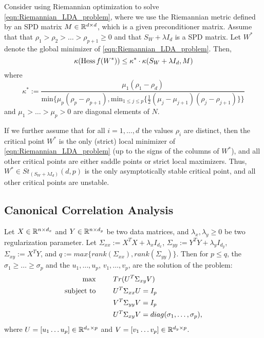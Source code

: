\documentclass[11pt,a4paper]{article}
\begin{document}
\begin{prop}
Consider using Riemannian optimization to solve \eqref{eqn:Riemannian_LDA_problem}, where we use the Riemannian metric defined by an SPD matrix $M\in\mathbb{R}^{d\times d}$, which is a given preconditioner matrix. Assume that that $\rho_1>\rho_2>\ldots>\rho_{p+1}\ge 0$ and that $S_W+\lambda I_d$ is a SPD matrix. Let $W^*$ denote the global minimizer of \eqref{eqn:Riemannian_LDA_problem}. Then,
\begin{equation*}
\kappa(\text{Hess}\, f(W^*)) \le \kappa^*\cdot \kappa(S_W+\lambda I_d, M)
\end{equation*}
where 
\begin{equation*}
\kappa^* := \dfrac{\mu_1(\rho_1-\rho_d)}{\text{min}\{\mu_p(\rho_p-\rho_{p+1}),{\text{min}}_{1\le j\le p}\{\frac{1}{2}(\mu_j-\mu_{j+1})(\rho_j-\rho_{j+1})\}\}}
\end{equation*}
and $\mu_1>\ldots>\mu_p>0$ are diagonal elements of $N$.

If we further assume that for all $i = 1,\ldots, d$ the values $\rho_i$ are distinct, then the critical point $W^*$ is the only (strict) local minimizer of \eqref{eqn:Riemannian_LDA_problem} (up to the signs of the columns of $W^*$), and all other critical points are either saddle points or strict local maximizers. Thus, $W^*\in St_{(S_W+\lambda I_d)}(d,p)$ is the only asymptotically stable critical point, and all other critical points are unstable.
\end{prop}

\subsection{Canonical Correlation Analysis}

Let $X\in \mathbb{R}^{n\times d_x}$ and $Y\in \mathbb{R}^{n\times d_y}$ be two data matrices, and $\lambda_x,\lambda_y\ge 0$ be two regularization parameter. Let $\Sigma_{xx}:=X^TX+\lambda_x I_{d_x}$, $\Sigma_{yy}:=Y^TY+\lambda_y I_{d_y}$, $\Sigma_{xy}:= X^TY$, and $q := max\{rank(\Sigma_{xx}),rank(\Sigma_{yy})\}$. Then for $p\le q$, the  $\sigma_1\ge \ldots\ge \sigma_p$ and the  $u_1,\ldots,u_p$,  $v_1,\ldots,v_p$, are the solution of the problem:
\begin{alignat*}{3}
{\text{max}}& &&Tr(U^T\Sigma_{xy}V) \\
\text{subject to}&\hspace{0.5cm} &&U^T\Sigma_{xx}U = I_p \\
& &&V^T\Sigma_{yy}V = I_p\\
& &&U^T\Sigma_{xy}V = diag(\sigma_1,\ldots,\sigma_p),
\end{alignat*}
where $U = [u_1 \ldots u_p]\in\mathbb{R}^{d_x\times p}$ and $V = [v_1 \ldots v_p]\in\mathbb{R}^{d_y\times p}$.
\end{document}
